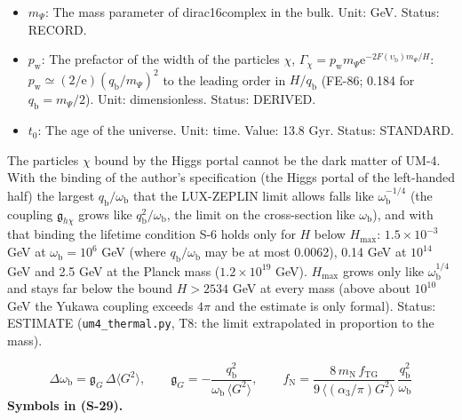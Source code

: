 \documentclass[
  10pt,
]{article}
\begin{document}
\begin{itemize}
  \(\upsilon_{\mathrm{r}} = \omega_{\mathrm{r}}/m_\Psi\) that of the
  real part of its resonance. Unit: dimensionless. Status: DERIVED.
\item
  \(m_\Psi\): The mass parameter of dirac16complex in the bulk. Unit:
  GeV. Status: RECORD.
\item
  \(p_{\mathrm{w}}\): The prefactor of the width of the particles
  \(\chi\),
  \(\Gamma_\chi = p_{\mathrm{w}}m_\Psi\mathrm{e}^{-2F(\upsilon_{\mathrm{b}})m_\Psi/H}\):
  \(p_{\mathrm{w}} \simeq (2/\mathrm{e})(q_{\mathrm{b}}/m_\Psi)^2\) to
  the leading order in \(H/q_{\mathrm{b}}\) (FE-86; 0.184 for
  \(q_{\mathrm{b}} = m_\Psi/2\)). Unit: dimensionless. Status: DERIVED.
\item
  \(t_0\): The age of the universe. Unit: time. Value: 13.8 Gyr. Status:
  STANDARD.
\end{itemize}

The particles \(\chi\) bound by the Higgs portal cannot be the dark
matter of UM-4. With the binding of the author's specification (the
Higgs portal of the left-handed half) the largest
\(q_{\mathrm{b}}/\omega_{\mathrm{b}}\) that the LUX-ZEPLIN limit allows
falls like \(\omega_{\mathrm{b}}^{-1/4}\) (the coupling
\(\mathfrak{g}_{h\chi}\) grows like
\(q_{\mathrm{b}}^2/\omega_{\mathrm{b}}\), the limit on the cross-section
like \(\omega_{\mathrm{b}}\)), and with that binding the lifetime
condition S-6 holds only for \(H\) below \(H_{\max}\):
\(1.5\times10^{-3}\) GeV at \(\omega_{\mathrm{b}} = 10^6\) GeV (where
\(q_{\mathrm{b}}/\omega_{\mathrm{b}}\) may be at most 0.0062), 0.14 GeV
at \(10^{14}\) GeV and 2.5 GeV at the Planck mass (\(1.2\times10^{19}\)
GeV). \(H_{\max}\) grows only like \(\omega_{\mathrm{b}}^{1/4}\) and
stays far below the bound \(H > 2534\) GeV at every mass (above about
\(10^{10}\) GeV the Yukawa coupling exceeds \(4\pi\) and the estimate is
only formal). Status: ESTIMATE (\texttt{um4\_thermal.py}, T8: the limit
extrapolated in proportion to the mass).

\[
\Delta\omega_{\mathrm{b}} = \mathfrak{g}_{G}\,\Delta\langle G^2\rangle,\qquad
\mathfrak{g}_{G} = -\frac{q_{\mathrm{b}}^2}{\omega_{\mathrm{b}}\,\langle G^2\rangle},\qquad
f_{\mathrm{N}} = \frac{8\,m_{\mathrm{N}}\,f_{\mathrm{TG}}}{9\,\langle(\alpha_3/\pi)G^2\rangle}\,\frac{q_{\mathrm{b}}^2}{\omega_{\mathrm{b}}} \tag{S-29}
\] \textbf{Symbols in (S-29).}
\end{document}
